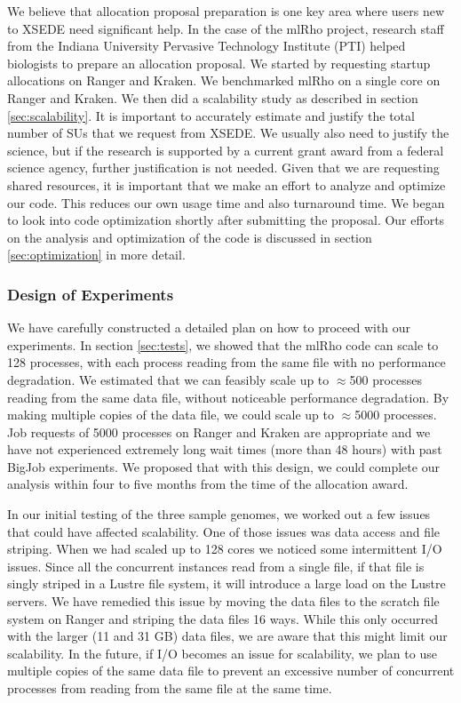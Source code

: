 \documentclass{sig-alternate}
\begin{document}
We believe that allocation proposal preparation is one key area where users new to XSEDE need significant
help. In the case of the mlRho project, research staff from the Indiana University Pervasive Technology
Institute (PTI) helped biologists to prepare an allocation proposal. We started by requesting startup
allocations on Ranger and Kraken. We benchmarked mlRho on a single core on Ranger and Kraken. We then did a
scalability study as described in section \ref{sec:scalability}. It is important to accurately estimate and
justify the total number of SUs that we request from XSEDE.  We usually also need to justify the science, but if the
research is supported by a current grant award from a federal science agency, further justification is not
needed. Given that we are requesting shared resources, it is important that we make an effort to analyze and
optimize our code. This reduces our own usage time and also turnaround time. We began to look into code
optimization shortly after submitting the proposal. Our efforts on the analysis and optimization of the code
is discussed in section \ref{sec:optimization} in more detail.


\subsubsection{Design of Experiments}

We have carefully constructed a detailed plan on how to proceed with our experiments. In section
\ref{sec:tests}, we showed that the mlRho code can scale to 128 processes, with each process reading from the
same file with no performance degradation. We estimated that we can feasibly scale up to $\approx$500
processes reading from the same data file, without noticeable performance degradation. By making multiple
copies of the data file, we could scale up to $\approx$5000 processes. Job requests of 5000 processes on
Ranger and Kraken are appropriate and we have not experienced extremely long wait times (more than 48 hours) with past BigJob experiments. We proposed that with this design, we could complete our analysis within four to five months from
the time of the allocation award. %

In our initial testing of the three sample genomes, we worked out a few issues that could have affected
scalability. One of those issues was data access and file striping. When we had scaled up to 128 cores we
noticed some intermittent I/O issues. Since all the concurrent instances read from a single file, if that file is
singly striped in a Lustre file system, it will introduce a large load on the Lustre servers. We have remedied
this issue by moving the data files to the scratch file system on Ranger and striping the data files 16
ways. While this only occurred with the larger (11 and 31 GB) data files, we are aware that this might limit
our scalability. In the future, if I/O becomes an issue for scalability, we plan to use multiple copies of the
same data file to prevent an excessive number of concurrent processes from reading from the same file at the
same time.
\end{document}
